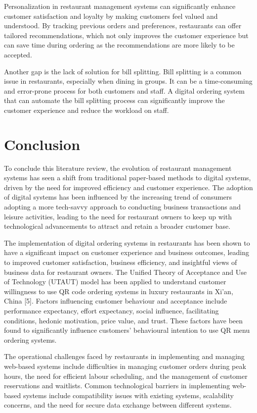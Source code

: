 Personalization in restaurant management systems can significantly enhance customer satisfaction and loyalty by making customers feel valued and understood. By tracking previous orders and preferences, restaurants can offer tailored recommendations, which not only improves the customer experience but can save time during ordering as the recommendations are more likely to be accepted.

Another gap is the lack of solution for bill splitting. Bill splitting is a common issue in restaurants, especially when dining in groups. It can be a time-consuming and error-prone process for both customers and staff. A digital ordering system that can automate the bill splitting process can significantly improve the customer experience and reduce the workload on staff.

\section{Conclusion}
To conclude this literature review, the evolution of restaurant management systems has seen a shift from traditional paper-based methods to digital systems, driven by the need for improved efficiency and customer experience. The adoption of digital systems has been influenced by the increasing trend of consumers adopting a more tech-savvy approach to conducting business transactions and leisure activities, leading to the need for restaurant owners to keep up with technological advancements to attract and retain a broader customer base. 

The implementation of digital ordering systems in restaurants has been shown to have a significant impact on customer experience and business outcomes, leading to improved customer satisfaction, business efficiency, and insightful views of business data for restaurant owners. The Unified Theory of Acceptance and Use of Technology (UTAUT) model has been applied to understand customer willingness to use QR code ordering systems in luxury restaurants in Xi'an, China [5]. Factors influencing customer behaviour and acceptance include performance expectancy, effort expectancy, social influence, facilitating conditions, hedonic motivation, price value, and trust. These factors have been found to significantly influence customers' behavioural intention to use QR menu ordering systems.

The operational challenges faced by restaurants in implementing and managing web-based systems include difficulties in managing customer orders during peak hours, the need for efficient labour scheduling, and the management of customer reservations and waitlists. Common technological barriers in implementing web-based systems include compatibility issues with existing systems, scalability concerns, and the need for secure data exchange between different systems.

